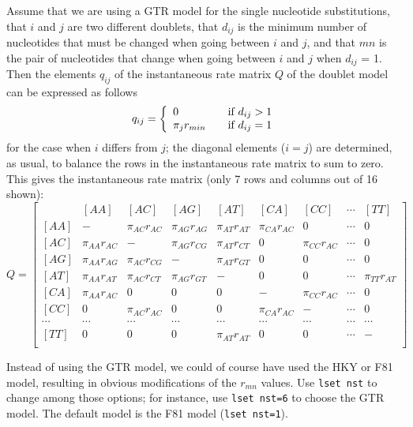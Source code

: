\documentclass[12pt]{book}
\begin{document}
Assume that we are using a GTR model for the single nucleotide substitutions, that $i$ and $j$ are
two different doublets, that $d_{ij}$ is the minimum number of nucleotides that must be changed
when going between $i$ and $j$, and that $mn$ is the pair of nucleotides that change when going
between $i$ and $j$ when $d_{ij}$ = 1. Then the elements $q_{ij}$ of the instantaneous rate matrix
$Q$ of the doublet model can be expressed as follows
\[
q_{ij} = \left\{
\begin{array}{l l}
  0 & \quad \text{if} ~d_{ij}>1 \\
 \pi_j r_{min} & \quad \text{if} ~d_{ij}=1\\
\end{array} \right.
\]
for the case when $i$ differs from $j$; the diagonal elements ($i = j$) are determined, as usual,
to balance the rows in the instantaneous rate matrix to sum to zero. This gives the instantaneous
rate matrix (only 7 rows and columns out of 16 shown):
\footnotesize
\[
Q=\begin{bmatrix}
    & [AA] & [AC] & [AG] & [AT] & [CA] & [CC] & \cdots & [TT]\\
 [AA]& - & \pi_{AC} r_{AC} & \pi_{AG} r_{AG} & \pi_{AT} r_{AT}& \pi_{CA} r_{AC} & 0 & \cdots & 0\\
 [AC]& \pi_{AA} r_{AC} & - & \pi_{AG} r_{CG} & \pi_{AT} r_{CT}& 0 & \pi_{CC} r_{AC} & \cdots & 0\\
 [AG]& \pi_{AA} r_{AG} & \pi_{AC} r_{CG} & - & \pi_{AT} r_{GT}& 0 & 0 & \cdots & 0 \\
 [AT]& \pi_{AA} r_{AT} & \pi_{AC} r_{CT} & \pi_{AG} r_{GT}& -& 0 & 0 & \cdots &  \pi_{TT} r_{AT}\\
 [CA]& \pi_{AA} r_{AC} & 0 & 0 & 0 & - &  \pi_{CC} r_{AC} & \cdots & 0\\
 [CC]& 0 & \pi_{AC} r_{AC} & 0 & 0 & \pi_{CA} r_{AC} & -  & \cdots & 0\\
 \cdots& \cdots& \cdots& \cdots& \cdots& \cdots& \cdots& \cdots& \cdots\\
 [TT]& 0 & 0 & 0 &\pi_{AT} r_{AT} & 0 & 0 & \cdots & -\\
\end{bmatrix}
\]
\normalsize

Instead of using the GTR model, we could of course have used the HKY or F81 model, resulting in
obvious modifications of the $r_{mn}$ values. Use \texttt{lset nst} to change among those options;
for instance, use \texttt{lset nst=6} to choose the GTR model. The default model is the F81 model
(\texttt{lset nst=1}).
\end{document}
